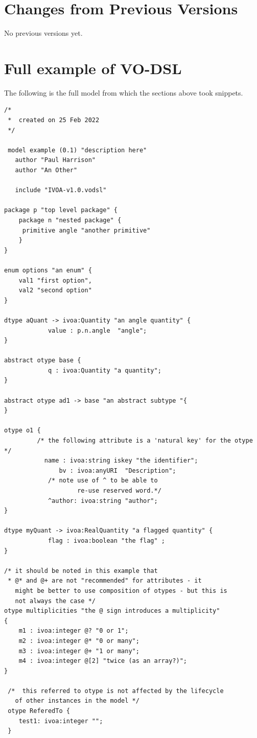 \documentclass[11pt,a4paper]{ivoa}
\begin{document}
\appendix
\section{Changes from Previous Versions}

No previous versions yet.  
\section{Full example of VO-DSL}

The following is the full model from which the sections above took snippets.
\begin{lstlisting}[language=vodsl]
/*
 *  created on 25 Feb 2022 
 */
 
 model example (0.1) "description here" 
   author "Paul Harrison"
   author "An Other"
   
   include "IVOA-v1.0.vodsl"
   
package p "top level package" {
	package n "nested package" {
     primitive angle "another primitive"     
	}
}
   
enum options "an enum" {
	val1 "first option",
	val2 "second option"
}   

dtype aQuant -> ivoa:Quantity "an angle quantity" {
			value : p.n.angle  "angle";
}

abstract otype base {
		    q : ivoa:Quantity "a quantity";   
}

abstract otype ad1 -> base "an abstract subtype "{	
}

otype o1 {
	     /* the following attribute is a 'natural key' for the otype */
	       name : ivoa:string iskey "the identifier";
			   bv : ivoa:anyURI  "Description";
		    /* note use of ^ to be able to 
		            re-use reserved word.*/	
		    ^author: ivoa:string "author"; 
}

dtype myQuant -> ivoa:RealQuantity "a flagged quantity" {
			flag : ivoa:boolean "the flag" ;
}

/* it should be noted in this example that
 * @* and @+ are not "recommended" for attributes - it 
   might be better to use composition of otypes - but this is 
   not always the case */
otype multiplicities "the @ sign introduces a multiplicity"
{
	m1 : ivoa:integer @? "0 or 1";
	m2 : ivoa:integer @* "0 or many";
	m3 : ivoa:integer @+ "1 or many";
	m4 : ivoa:integer @[2] "twice (as an array?)";
}

 /*  this referred to otype is not affected by the lifecycle
   of other instances in the model */
 otype ReferedTo { 
 	test1: ivoa:integer "";
 }


\end{lstlisting}
\end{document}
